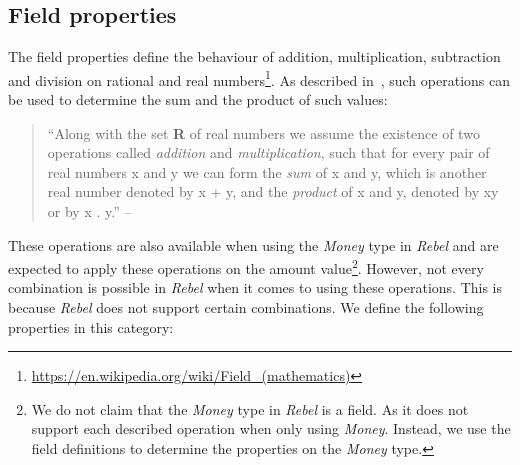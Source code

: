 \subsection{Field properties}
\label{ssct:properties_definitions_fieldproperties}
The field properties define the behaviour of addition, multiplication, subtraction and division on rational and real numbers\footnote{\url{https://en.wikipedia.org/wiki/Field_(mathematics)}}. As described
in~\cite{apostol2007calculus}, such operations can be used to determine the sum and the product of such values:
\begin{quote}
	``Along with the set \textbf{R} of real numbers we assume the existence of two operations called
	\textit{addition} and \textit{multiplication}, such that for every pair of real numbers x and y we can form the
	\textit{sum} of x and y, which is another real number denoted by x + y, and the \textit{product} of x and y,
	denoted by xy or by x . y.''
	-- ~\cite{apostol2007calculus}
\end{quote}
These operations are also available
when using the \textit{Money} type in \textit{Rebel} and are expected to apply
these operations on the amount value\footnote{We do not claim that the \textit{Money} type in \textit{Rebel} is a field. As it does not support each described operation when only using \textit{Money}. Instead, we use the field definitions to determine the properties on the \textit{Money} type.}. However, not every combination is possible
in \textit{Rebel} when it comes to using these operations. This is because \textit{Rebel} does not support certain combinations. We define the following properties in this category:

